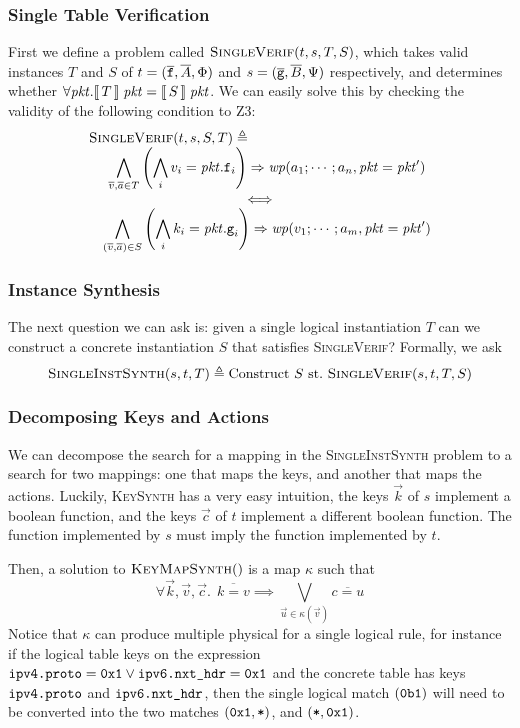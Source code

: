\subsubsection{Single Table Verification}
First we define a problem called $\textsc{SingleVerif}(t,s,T, S)$,
which takes valid instances $T$ and $S$ of
$t = (\overline{\texttt{f}}, \overline{A}, \Phi)$ and
$s = (\overline{\texttt{g}}, \overline{B}, \Psi)$ respectively, and determines
whether $\forall \mathit{pkt}. \llbracket\,T\,\rrbracket\;\mathit{pkt} = \llbracket\,S\,\rrbracket\; \mathit{pkt}$. We can
easily solve this by checking the validity of the following condition
to Z3:
\[\begin{array}c
    \multicolumn{1}{l}{\textsc{SingleVerif}(t,s,S,T) \triangleq}\\
    \displaystyle \quad \bigwedge_{\vec v, \vec a \in T}
    \left(\bigwedge_i v_i = \pkt.\var f_i\right) \Rightarrow \wp(a_1;\cdots;a_n,\pkt = \pkt')\\ \iff \\
    \displaystyle \quad \bigwedge_{(\vec v, \vec a) \in S}\left(\bigwedge_i k_i = \pkt.\var g_i\right) \Rightarrow \wp(v_1;\cdots; a_m, \pkt= \pkt')
  \end{array}
\]

\subsubsection{Instance Synthesis}

The next question we can ask is: given a single logical instantiation
$T$ can we construct a concrete instantiation $S$ that satisfies
\textsc{SingleVerif}? Formally, we ask
\[\textsc{SingleInstSynth}(s,t,T) \triangleq \textrm{Construct}~S~\textrm{st.}~\textsc{SingleVerif}(s,t,T, S)\]

\subsubsection{Decomposing Keys and Actions}

We can decompose the search for a mapping in the
\textsc{SingleInstSynth} problem to a search for two mappings: one
that maps the keys, and another that maps the actions. Luckily,
\textsc{KeySynth} has a very easy intuition, the keys $\vec k$ of $s$
implement a boolean function, and the keys $\vec c$ of $t$ implement a
different boolean function. The function implemented by $s$ must imply
the function implemented by $t$.

Then, a solution to $\textsc{KeyMapSynth}()$ is a map $\kappa$ such
that
\[\forall \vec k, \vec v, \vec c.~~\overline{k = v} \implies \bigvee_{\vec u \in \kappa(\vec v)} \overline{c = u}\]
Notice that $\kappa$ can produce multiple physical for a single
logical rule, for instance if the logical table keys on the expression
$\texttt{ipv4.proto} = \texttt{0x1} \vee \texttt{ipv6.nxt\_hdr} = \texttt{0x1}$
and the concrete table has keys $\texttt{ipv4.proto}$ and
$\texttt{ipv6.nxt\_hdr}$, then the single logical match $(\texttt{0b1})$
will need to be converted into the two matches $(\texttt{0x1},\texttt{*})$,
and $(\texttt{*}, \texttt{0x1})$. 

